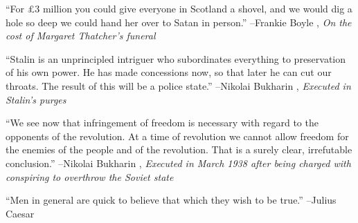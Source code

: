 \documentclass{article}%
\begin{document}
\linebreak%
\vspace{1mm}%
\begin{minipage}{\textwidth}%
\flushleft%
“For £3 million you could give everyone in Scotland a shovel, and we would dig a hole so deep we could hand her over to Satan in person.”%
\linebreak%
\vspace{1mm}%
–Frankie Boyle%
, \textit{On the cost of Margaret Thatcher's funeral}%
\linebreak%
\vspace{1mm}%
\end{minipage}%
\linebreak%
\vspace{1mm}%
\begin{minipage}{\textwidth}%
\flushleft%
“Stalin is an unprincipled intriguer who subordinates everything to preservation  of his own power. He has made concessions now, so that later he can cut our throats.  The result of this will be a police state.”%
\linebreak%
\vspace{1mm}%
–Nikolai Bukharin%
, \textit{Executed in Stalin's purges}%
\linebreak%
\vspace{1mm}%
\end{minipage}%
\linebreak%
\vspace{1mm}%
\begin{minipage}{\textwidth}%
\flushleft%
“We see now that infringement of freedom is necessary with regard to the opponents of the revolution. At a time of revolution we cannot allow freedom for the enemies of the people and of the revolution. That is a surely clear, irrefutable conclusion.”%
\linebreak%
\vspace{1mm}%
–Nikolai Bukharin%
, \textit{Executed in March 1938 after being charged with conspiring to overthrow the Soviet state}%
\linebreak%
\vspace{1mm}%
\end{minipage}%
\linebreak%
\vspace{1mm}%
\begin{minipage}{\textwidth}%
\flushleft%
“Men in general are quick to believe that which they wish to be true.”%
\linebreak%
\vspace{1mm}%
–Julius Caesar%
\linebreak%
\vspace{1mm}%
\end{minipage}%
\end{document}
